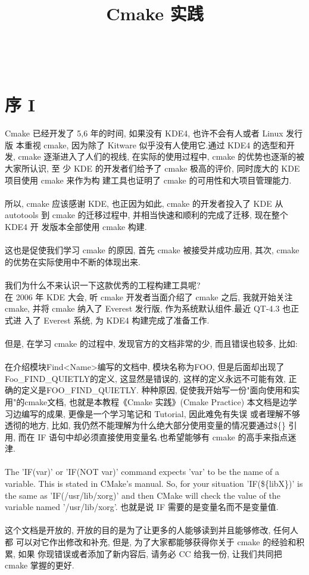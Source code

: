 \documentclass[oneside, 12pt]{book}
\title{\fontsize{50}{60}\selectfont Cmake 实践\\ \subtitleFont{Cmake Practice}}
\author{\authorFont{Cjacker \& VIXNESS.meolin}\\ \\ \NovaMonoFont{vix2018@gmail.com}}
\date{\NovaMonoFont 2019}
\begin{document}
\begin{titlepage}
  \maketitle
\end{titlepage}
\tableofcontents
\setcounter{chapter}{0}
	\renewcommand{\thechapter}{\Roman{chapter}}
  \chapter{序 I}
  Cmake 已经开发了 5,6 年的时间, 如果没有 KDE4, 也许不会有人或者 Linux 发行版 本重视 cmake, 因为除了 Kitware 似乎没有人使用它.通过 KDE4 的选型和开发, cmake 逐渐进入了人们的视线, 在实际的使用过程中, cmake 的优势也逐渐的被大家所认识, 至 少 KDE 的开发者们给予了 cmake 极高的评价, 同时庞大的 KDE 项目使用 cmake 来作为构 建工具也证明了 cmake 的可用性和大项目管理能力.\\ \\
所以, cmake 应该感谢 KDE, 也正因为如此, cmake 的开发者投入了 KDE 从 autotools 到 cmake 的迁移过程中, 并相当快速和顺利的完成了迁移, 现在整个 KDE4 开 发版本全部使用 cmake 构建.\\ \\
这也是促使我们学习 cmake 的原因, 首先 cmake 被接受并成功应用, 其次, cmake 的优势在实际使用中不断的体现出来.\\ \\
我们为什么不来认识一下这款优秀的工程构建工具呢?\\
在 2006 年 KDE 大会, 听 cmake 开发者当面介绍了 cmake 之后, 我就开始关注 cmake, 并将 cmake 纳入了 Everest 发行版, 作为系统默认组件.最近 QT-4.3 也正式进 入了 Everest 系统, 为 KDE4 构建完成了准备工作.\\\\
但是, 在学习 cmake 的过程中, 发现官方的文档非常的少, 而且错误也较多, 比如:\\\\
在介绍模块Find<Name>编写的文档中, 模块名称为FOO, 但是后面却出现了Foo\_FIND\_QUIETLY的定义,  这显然是错误的, 这样的定义永远不可能有效, 正确的定义是FOO\_FIND\_QUIETLY. 
种种原因, 促使我开始写一份"面向使用和实用"的cmake文档, 也就是本教程《Cmake 实践》(Cmake Practice)
本文档是边学习边编写的成果, 更像是一个学习笔记和 Tutorial, 因此难免有失误 或者理解不够透彻的地方, 比如, 我仍然不能理解为什么绝大部分使用变量的情况要通过\$\{\}
引用, 而在 IF 语句中却必须直接使用变量名.也希望能够有 cmake 的高手来指点迷津.\\\\
The 'IF(var)' or 'IF(NOT var)' command expects 'var' to be the name of a variable. This is stated in CMake's manual. So, for your situation 'IF(\$\{libX\})'
 is the same as 'IF(/usr/lib/xorg)' and then CMake will check the value of the variable named '/usr/lib/xorg'. 也就是说 IF 需要的是变量名而不是变量值.\\\\
这个文档是开放的, 开放的目的是为了让更多的人能够读到并且能够修改, 任何人都 可以对它作出修改和补充, 但是, 为了大家都能够获得你关于 cmake 的经验和积累, 如果 你现错误或者添加了新内容后, 请务必 CC 给我一份, 让我们共同把 cmake 掌握的更好.\\\\
\end{document}
